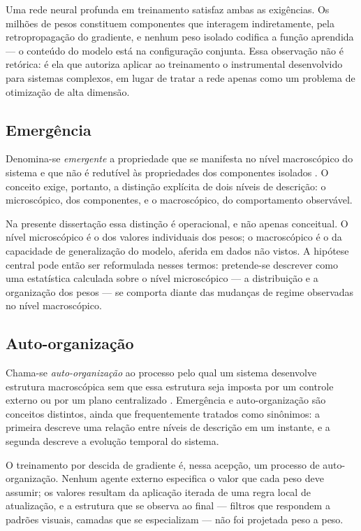 Uma rede neural profunda em treinamento satisfaz ambas as exigências. Os
milhões de pesos constituem componentes que interagem indiretamente, pela
retropropagação do gradiente, e nenhum peso isolado codifica a função aprendida
--- o conteúdo do modelo está na configuração conjunta. Essa observação não é
retórica: é ela que autoriza aplicar ao treinamento o instrumental
desenvolvido para sistemas complexos, em lugar de tratar a rede apenas como um
problema de otimização de alta dimensão.

\subsection{Emergência}

Denomina-se \emph{emergente} a propriedade que se manifesta no nível
macroscópico do sistema e que não é redutível às propriedades dos componentes
isolados \cite{sayama2015}. O conceito exige, portanto, a distinção explícita de
dois níveis de descrição: o microscópico, dos componentes, e o macroscópico, do
comportamento observável.

Na presente dissertação essa distinção é operacional, e não apenas conceitual.
O nível microscópico é o dos valores individuais dos pesos; o macroscópico é o
da capacidade de generalização do modelo, aferida em dados não vistos. A
hipótese central pode então ser reformulada nesses termos: pretende-se
descrever como uma estatística calculada sobre o nível microscópico --- a
distribuição e a organização dos pesos --- se comporta diante das mudanças de
regime observadas no nível macroscópico.

\subsection{Auto-organização}

Chama-se \emph{auto-organização} ao processo pelo qual um sistema desenvolve
estrutura macroscópica sem que essa estrutura seja imposta por um controle
externo ou por um plano centralizado \cite{sayama2015}. Emergência e
auto-organização são conceitos distintos, ainda que frequentemente tratados como
sinônimos: a primeira descreve uma relação entre níveis de descrição em um
instante, e a segunda descreve a evolução temporal do sistema.

O treinamento por descida de gradiente é, nessa acepção, um processo de
auto-organização. Nenhum agente externo especifica o valor que cada peso deve
assumir; os valores resultam da aplicação iterada de uma regra local de
atualização, e a estrutura que se observa ao final --- filtros que respondem a
padrões visuais, camadas que se especializam --- não foi projetada peso a peso.

